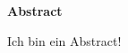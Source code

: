

\begin{center}
    \noindent\textbf{\Huge \textsf{Abstract}}
\end{center}

\noindent Ich bin ein Abstract!

\pagebreak

